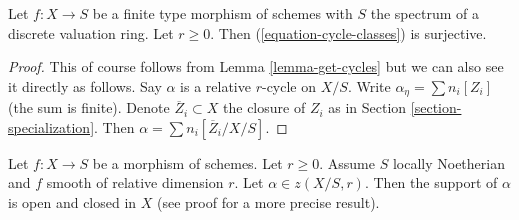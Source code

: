 \begin{lemma}
\label{lemma-get-cycles-dvr}
Let $f : X \to S$ be a finite type morphism of schemes with $S$
the spectrum of a discrete valuation ring. Let $r \geq 0$.
Then (\ref{equation-cycle-classes}) is surjective.
\end{lemma}

\begin{proof}
This of course follows from Lemma \ref{lemma-get-cycles} but we can
also see it directly as follows. Say $\alpha$ is a relative $r$-cycle
on $X/S$. Write $\alpha_\eta = \sum n_i[Z_i]$ (the sum is finite). Denote
$\overline{Z}_i \subset X$ the closure of $Z_i$ as in
Section \ref{section-specialization}. Then
$\alpha = \sum n_i[\overline{Z}_i/X/S]$.
\end{proof}

\begin{lemma}
\label{lemma-relative-cycle-smooth}
Let $f : X \to S$ be a morphism of schemes. Let $r \geq 0$. Assume $S$
locally Noetherian and $f$ smooth of relative dimension $r$. Let
$\alpha \in z(X/S, r)$. Then the support of $\alpha$ is open and closed in $X$
(see proof for a more precise result).
\end{lemma}

